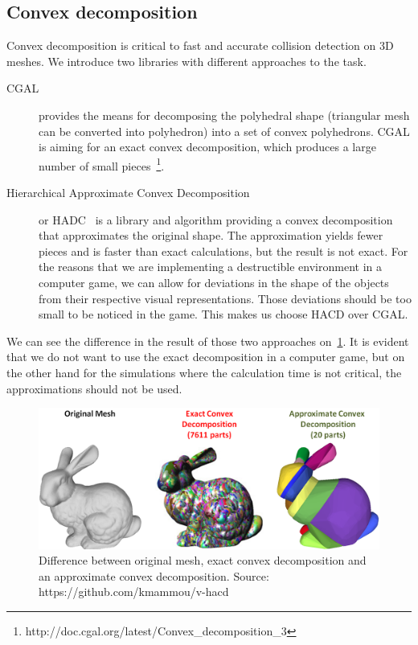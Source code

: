 \subsection{Convex decomposition}
\label{sec:decompositionLib}
Convex decomposition is critical to fast and accurate collision detection on 3D meshes. We introduce two libraries with different approaches to the task.
\begin{description}
\item[CGAL] provides the means for decomposing the polyhedral shape (triangular mesh can be converted into polyhedron) into a set of convex polyhedrons. CGAL is aiming for an exact convex decomposition, which produces a large number of small pieces~\footnote{http://doc.cgal.org/latest/Convex\_decomposition\_3}.

\item[Hierarchical Approximate Convex Decomposition] or HADC~\cite{HACD} is a library and algorithm providing a convex decomposition that approximates the original shape. The approximation yields fewer pieces and is faster than exact calculations, but the result is not exact. For the reasons that we are implementing a destructible environment in a computer game, we can allow for deviations in the shape of the objects from their respective visual representations. Those deviations should be too small to be noticed in the game. This makes us choose HACD over CGAL.
\end{description}

We can see the difference in the result of those two approaches on~\cref{fig:bunny}. It is evident that we do not want to use the exact decomposition in a computer game, but on the other hand for the simulations where the calculation time is not critical, the approximations should not be used.
\begin{figure}
        \centering
        \includegraphics[width=\textwidth]{img/bunny}
        \caption{Difference between original mesh, exact convex decomposition and an approximate convex decomposition. Source: https://github.com/kmammou/v-hacd}
        \label{fig:bunny}
\end{figure}


